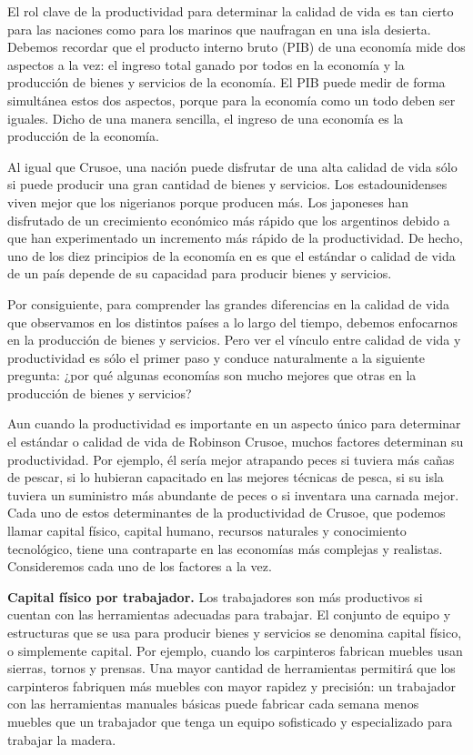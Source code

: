 \documentclass[
]{krantz}
\begin{document}
El rol clave de la productividad para determinar la calidad de vida es tan cierto para las naciones como para los marinos que naufragan en una isla desierta. Debemos recordar que el producto interno bruto (PIB) de una economía mide dos aspectos a la vez: el ingreso total ganado por todos en la economía y la producción de bienes y servicios de la economía. El PIB puede medir de forma simultánea estos dos aspectos, porque para la economía como un todo deben ser iguales. Dicho de una manera sencilla, el ingreso de una economía es la producción de la economía.

Al igual que Crusoe, una nación puede disfrutar de una alta calidad de vida sólo si puede producir una gran cantidad de bienes y servicios. Los estadounidenses viven mejor que los nigerianos porque producen más. Los japoneses han disfrutado de un crecimiento económico más rápido que los argentinos debido a que han experimentado un incremento más rápido de la productividad. De hecho, uno de los diez principios de la economía en es que el estándar o calidad de vida de un país depende de su capacidad para producir bienes y servicios.

Por consiguiente, para comprender las grandes diferencias en la calidad de vida que observamos en los distintos países a lo largo del tiempo, debemos enfocarnos en la producción de bienes y servicios. Pero ver el vínculo entre calidad de vida y productividad es sólo el primer paso y conduce naturalmente a la siguiente pregunta: ¿por qué algunas economías son mucho mejores que otras en la producción de bienes y servicios?

Aun cuando la productividad es importante en un aspecto único para determinar el estándar o calidad de vida de Robinson Crusoe, muchos factores determinan su productividad. Por ejemplo, él sería mejor atrapando peces si tuviera más cañas de pescar, si lo hubieran capacitado en las mejores técnicas de pesca, si su isla tuviera un suministro más abundante de peces o si inventara una carnada mejor. Cada uno de estos determinantes de la productividad de Crusoe, que podemos llamar capital físico, capital humano, recursos naturales y conocimiento tecnológico, tiene una contraparte en las economías más complejas y realistas. Consideremos cada uno de los factores a la vez.

\textbf{Capital físico por trabajador.} Los trabajadores son más productivos si cuentan con las herramientas adecuadas para trabajar. El conjunto de equipo y estructuras que se usa para producir bienes y servicios se denomina capital físico, o simplemente capital. Por ejemplo, cuando los carpinteros fabrican muebles usan sierras, tornos y prensas. Una mayor cantidad de herramientas permitirá que los carpinteros fabriquen más muebles con mayor rapidez y precisión: un trabajador con las herramientas manuales básicas puede fabricar cada semana menos muebles que un trabajador que tenga un equipo sofisticado y especializado para trabajar la madera.
\end{document}
